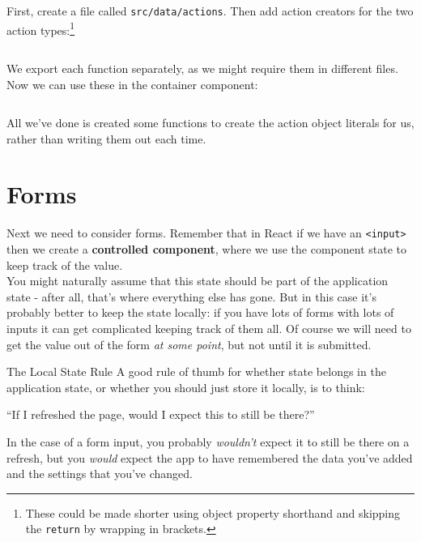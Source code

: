 First, create a file called \texttt{src/data/actions}. Then add action creators for the two action types:\footnote{These could be made shorter using object property shorthand and skipping the \texttt{return} by wrapping in brackets.}

\inputminted{js}{03/figures/02-action-creators.js}

We export each function separately, as we might require them in different files.
\\

Now we can use these in the container component:

\inputminted{js}{03/figures/03-ButtonContainer.js}

All we've done is created some functions to create the action object literals for us, rather than writing them out each time.


\section{Forms}

Next we need to consider forms. Remember that in React if we have an \texttt{<input>} then we create a \textbf{controlled component}, where we use the component state to keep track of the value.
\\

You might naturally assume that this state should be part of the application state - after all, that's where everything else has gone. But in this case it's probably better to keep the state locally: if you have lots of forms with lots of inputs it can get complicated keeping track of them all. Of course we will need to get the value out of the form \textit{at some point}, but not until it is submitted.

\begin{infobox}{The Local State Rule}
    A good rule of thumb for whether state belongs in the application state, or whether you should just store it locally, is to think:

    \begin{center}
        ``If I refreshed the page, would I expect this to still be there?''
    \end{center}

    In the case of a form input, you probably \textit{wouldn't} expect it to still be there on a refresh, but you \textit{would} expect the app to have remembered the data you've added and the settings that you've changed.
\end{infobox}

